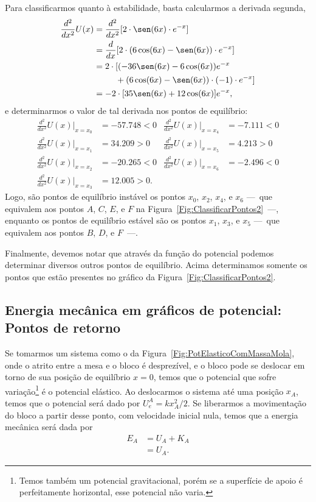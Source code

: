 Para classificarmos quanto à estabilidade, basta calcularmos a derivada segunda,
\begin{align}
    \frac{d^2}{dx^2} U(x) &= \frac{d^2}{dx^2} [2\cdot\sen(6x)\cdot e^{-x}] \\
    &= \frac{d}{dx} [2\cdot(6\cos(6x) - \sen(6x))\cdot e^{-x}] \\
    &= 2\cdot[(-36\sen(6x) - 6\cos(6x)) e^{-x} \\
    &\phantom{=2\cdot[} + (6\cos(6x) - \sen(6x))\cdot(-1)\cdot e^{-x}] \nonumber \\
    &= -2\cdot[35\sen(6x) + 12\cos(6x)]e^{-x},
\end{align}
%
e determinarmos o valor de tal derivada nos pontos de equilíbrio:
\begin{align*}
    \frac{d^2}{dx^2} U(x)|_{x = x_0} &= -57.748 < 0 & \frac{d^2}{dx^2} U(x)|_{x = x_4} &= -7.111 < 0 \\
    \frac{d^2}{dx^2} U(x)|_{x = x_1} &= 34.209 > 0  & \frac{d^2}{dx^2} U(x)|_{x = x_5} &= 4.213 > 0 \\
    \frac{d^2}{dx^2} U(x)|_{x = x_2} &= -20.265 < 0 & \frac{d^2}{dx^2} U(x)|_{x = x_6} &= -2.496 < 0 \\
    \frac{d^2}{dx^2} U(x)|_{x = x_3} &= 12.005 > 0.
\end{align*}
%
Logo, são pontos de equilíbrio instável os pontos $x_0$, $x_2$, $x_4$, e $x_6$ ---~que equivalem aos pontos $A$, $C$, $E$, e $F$ na Figura~\ref{Fig:ClassificarPontos2}~---, enquanto os pontos de equilíbrio estável são os pontos $x_1$, $x_3$, e $x_5$ ---~que equivalem aos pontos $B$, $D$, e $F$~---.

Finalmente, devemos notar que através da função do potencial podemos determinar diversos outros pontos de equilíbrio. Acima determinamos somente os pontos que estão presentes no gráfico da Figura~\ref{Fig:ClassificarPontos2}.

\subsection{Energia mecânica em gráficos de potencial: Pontos de retorno}

Se tomarmos um sistema como o da Figura~\ref{Fig:PotElasticoComMassaMola}, onde o atrito entre a mesa e o bloco é desprezível, e o bloco pode se deslocar em torno de sua posição de equilíbrio $x = 0$, temos que o potencial que sofre variação\footnote{Temos também um potencial gravitacional, porém se a superfície de apoio é perfeitamente horizontal, esse potencial não varia.} é o potencial elástico. Ao deslocarmos o sistema até uma posição $x_A$, temos que o potencial será dado por $U_e^A = kx_A^2 /2$. Se liberarmos a movimentação do bloco a partir desse ponto, com velocidade inicial nula, temos que a energia mecânica será dada por
\begin{align}
  E_A &= U_A + K_A \\
  &= U_A.
\end{align}

